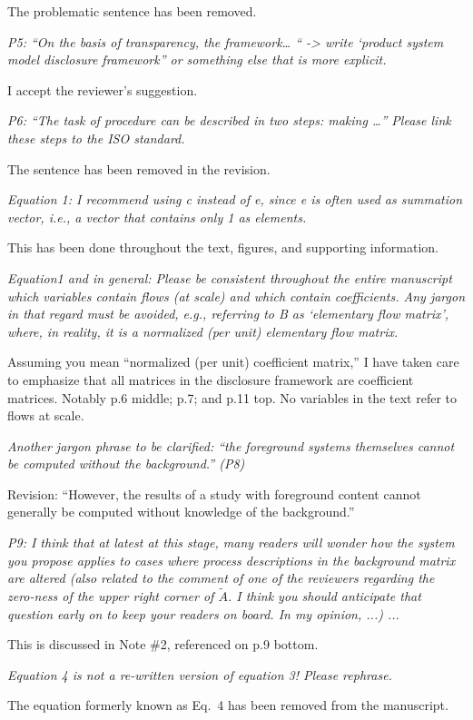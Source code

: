 \documentclass[11pt,letterpaper]{article}
\begin{document}
The problematic sentence has been removed.

\emph{P5: “On the basis of transparency, the framework… “ -> write ‘product system model disclosure framework” or something else that is more explicit.}

I accept the reviewer's suggestion.

\emph{P6: “The task of procedure can be described in two steps: making …” Please link these steps to the ISO standard.}

The sentence has been removed in the revision.

\emph{Equation 1: I recommend using c instead of e, since e is often used as summation vector, i.e., a vector that contains only 1 as elements.}

This has been done throughout the text, figures, and supporting information.

\emph{Equation1 and in general: Please be consistent throughout the entire manuscript which variables contain flows (at scale) and which contain coefficients. Any jargon in that regard must be avoided, e.g., referring to B as ‘elementary flow matrix’, where, in reality, it is a normalized (per unit) elementary flow matrix.}

Assuming you mean ``normalized (per unit) coefficient matrix,'' I have taken care to emphasize that all matrices in the disclosure framework are coefficient matrices.  Notably p.6 middle; p.7; and p.11 top.  No variables in the text refer to flows at scale.  

\emph{Another jargon phrase to be clarified:
  “the foreground systems themselves cannot be computed without the background.” (P8)}

Revision: ``However, the results of a study with foreground content cannot generally be computed without knowledge of the background.''

\emph{P9: I think that at latest at this stage, many readers will wonder how the system you propose applies to cases where process descriptions in the background matrix are altered (also related to the comment of one of the reviewers regarding the zero-ness of the upper right corner of $\tilde{A}$. I think you should anticipate that question early on to keep your readers on board. In my opinion, ...) ...}

This is discussed in Note \#2, referenced on p.9 bottom.

\emph{Equation 4 is not a re-written version of equation 3! Please rephrase.}

The equation formerly known as Eq.~4 has been removed from the manuscript.
\end{document}

